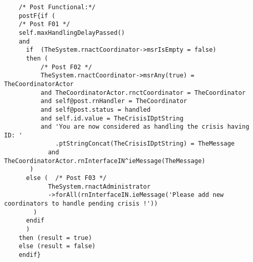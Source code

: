 	\scriptsize
	\vspace{0.5cm}
	\begin{lstlisting}[style=MessirStyle,firstnumber=auto,captionpos=b,caption={\msrmessir (MCL-oriented) specification of the operation \emph{isAllocatedIfPossible}.},label=OM-ctCrisis-isAllocatedIfPossible-MCL-LST]

	
	
	/* Post Functional:*/ 
	postF{if (   
	/* Post F01 */
	self.maxHandlingDelayPassed()
	and 
	  if  (TheSystem.rnactCoordinator->msrIsEmpty = false)
	  then (
	      /* Post F02 */
	      TheSystem.rnactCoordinator->msrAny(true) = TheCoordinatorActor
	      and TheCoordinatorActor.rnctCoordinator = TheCoordinator
	      and self@post.rnHandler = TheCoordinator
	      and self@post.status = handled
	      and self.id.value = TheCrisisIDptString
	      and 'You are now considered as handling the crisis having ID: '
	          .ptStringConcat(TheCrisisIDptString) = TheMessage
	        and TheCoordinatorActor.rnInterfaceIN^ieMessage(TheMessage)
	   )
	  else (  /* Post F03 */
	        TheSystem.rnactAdministrator
	        ->forAll(rnInterfaceIN.ieMessage('Please add new coordinators to handle pending crisis !'))
	    )
	  endif
	  )
	then (result = true)
	else (result = false)
	endif}
	
	
	\end{lstlisting}
	\normalsize 
	
	
	
	





